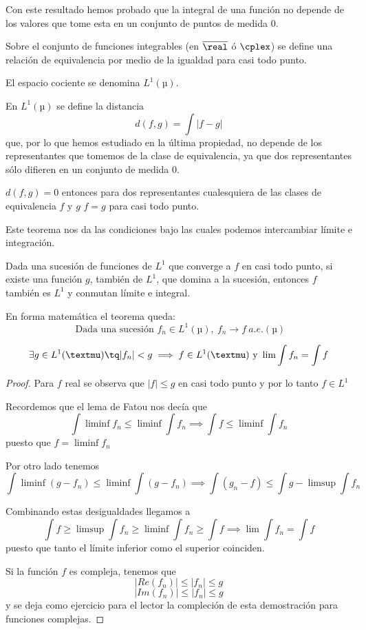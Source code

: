 \documentclass{apuntes}
\begin{document}
Con este resultado hemos probado que la integral de una función no depende de los valores que tome esta en un conjunto de puntos de medida 0.

Sobre el conjunto de funciones integrables (en $\overline{\real}$ ó $\cplex$) se define una relación de equivalencia por medio de la igualdad para casi todo punto.

El espacio cociente se denomina $L^1(µ).$


En $L^1(µ)$ se define la distancia
\[d(f,g) = \int |f-g|\]
que, por lo que hemos estudiado en la última propiedad, no depende de los representantes que tomemos de la clase de equivalencia, ya que dos representantes sólo difieren en un conjunto de medida 0.

\obs $d(f,g)=0$ entonces para dos representantes cualesquiera de las clases de equivalencia $f$ y $g$ $f=g$ para casi todo punto.

\begin{theorem}
Este teorema nos da las condiciones bajo las cuales podemos intercambiar límite e integración.

Dada una sucesión de funciones de $L^1$ que converge a $f$ en casi todo punto, si existe una función $g$, también de $L^1$, que domina a la sucesión, entonces $f$ también es $L^1$ y conmutan límite e integral.

En forma matemática el teorema queda:
\[\text{ Dada una sucesión } f_n\in L^1(µ), \ f_n \rightarrow f \ a.e.(µ) \]

\[\exists g \in L^1(µ) \tq |f_n| < g \implies f \in L^1(µ) \text{ y } \lim \int f_n = \int f\]
\end{theorem}
\begin{proof}
Para $f$ real se observa que $|f| \leq g$ en casi todo punto y por lo tanto $f \in L^1$

Recordemos que el lema de Fatou nos decía que
\[\int \liminf f_n \leq \liminf \int f_n \implies \int f \leq \liminf \int f_n\]
puesto que $f=\liminf f_n$

Por otro lado tenemos
\[\int \liminf (g - f_n) \leq \liminf \int (g-f_n) \implies \int (g_n -f) \leq \int g-\limsup \int f_n\]

Combinando estas desigualdades llegamos a
\[\int f  \geq \limsup \int f_n \geq \liminf \int f_n \geq \int f \implies \lim \int f_n = \int f\]
puesto que tanto el límite inferior como el superior coinciden.

Si la función $f$ es compleja, tenemos que
\[|Re(f_n)| \leq |f_n| \leq g\]
\[|Im(f_n)| \leq |f_n| \leq g\]
y se deja como ejercicio para el lector la compleción de esta demostración para funciones complejas.
\end{proof}
\end{document}
